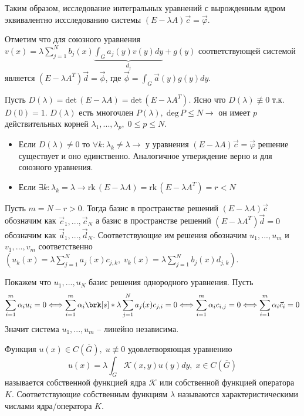 Таким образом, исследование интегральных уравнений с вырожденным ядром эквивалентно иссследованию системы $(E -\lambda A)\vec{c} = \vec{\varphi}$.

\begin{offtop}
Отметим что для союзного уравнения $v(x) = \lambda \sum_{j = 1}^{N}b_{j}(x)\underbrace{\int_{G}a_{j}(y)v(y)dy}_{d_{j}} + g(y)$ соответствующей системой является $(E - \lambda A^{T})\vec{d}=\vec{\phi}$, где $\vec{\phi}=\int_{G} \vec{a}(y)g(y)dy$.
\end{offtop}

Пусть $D(\lambda) = \mathrm{det}\,(E - \lambda A) = \mathrm{det}\,(E - \lambda A^{T})$. Ясно что $D(\lambda) \not\equiv 0$ т.к. $D(0) = 1$. $D(\lambda)$ есть многочлен $P(\lambda), \; \mathrm{deg}\, P \leq N \longrightarrow$ он имеет $p$ действительных корней $\lambda_{1},...,\lambda_{p},\; 0 \leq p \leq N$.
\begin{itemize}
  \item Если $D(\lambda) \neq 0$ то $\forall k: \lambda_{k} \neq \lambda \longrightarrow$ у уравнения $(E - \lambda A)\vec{c} = \vec{\varphi}$ решение существует и оно единственно. Аналогичное утверждение верно и для союзного уравнения.
  \item Если $\exists k: \lambda_{k} = \lambda \rightarrow \mathrm{rk}\,(E - \lambda A) = \mathrm{rk}\,(E - \lambda A^{T}) = r < N$
\end{itemize}

Пусть $m = N - r > 0$. Тогда базис в пространстве решений $(E - \lambda A)\vec{c}$ обозначим как $\vec{c}_{1},...,\vec{c}_{N}$ а базис в пространстве решений $(E - \lambda A^{T})\vec{d}=0$ обозначим как $\vec{d}_{1},...,\vec{d}_{N}$. Соответствующие им решения обозначим $u_{1},...,u_{m}$ и $v_{1},...,v_{m}$ соответственно $(u_{k}(x) = \lambda \sum_{j = 1}^{N}a_{j}(x)c_{j,k}, \; v_{k}(x) = \lambda \sum_{j = 1}^{N}b_{j}(x)d_{j,k})$.

Покажем что $u_{1},...,u_{N}$ базис решения однородного уравнения. Пусть
$$\sum_{i=1}^{m}\alpha_{i}u_{i} = 0 \Longleftrightarrow \sum_{i=1}^{m}\alpha_{i}\brk[s]*{\lambda\sum_{j=1}^{N}a_{j}(x)c_{j,i}} = 0 \Longleftrightarrow \sum_{i=1}^{m}\alpha_{i}c_{i,j} = 0 \Longleftrightarrow \sum_{i=1}^{m}\alpha_{i}\vec{c}_{i} = 0$$
Значит система $u_{1},...,u_{m}$ -- линейно независима.

\begin{definition}
Функция $u(x) \in C(\overline{G}), \; u \not\equiv 0$ удовлетворяющая уравнению
$$u(x) = \lambda \int_{G}\mathcal{K}(x,y)u(y)dy, \; x \in C(\overline{G})$$
называется собственной функцией ядра $\mathcal{K}$ или собственной функцией оператора $K$. Соответствующие собственным функциям $\lambda$ называются характеристическими числами ядра/оператора $K$.
\end{definition}

